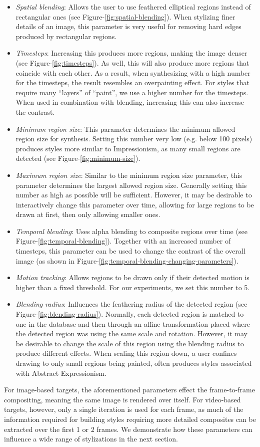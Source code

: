 \documentclass[a4paper,10pt,final]{ThesisStyle}
\begin{document}
\begin{itemize}
\item \textit{Spatial blending}: Allows the user to use feathered elliptical regions instead of rectangular ones (see Figure-\ref{fig:spatial-blending}).  When stylizing finer details of an image, this parameter is very useful for removing hard edges produced by rectangular regions.  
\item \textit{Timesteps}: Increasing this produces more regions, making the image denser (see Figure-\ref{fig:timesteps}).  As well, this will also produce more regions that coincide with each other.  As a result, when synthesizing with a high number for the timesteps, the result resembles an overpainting effect.  For styles that require many ``layers'' of ``paint'', we use a higher number for the timesteps.  When used in combination with blending, increasing this can also increase the contrast.
\item \textit{Minimum region size}: This parameter determines the minimum allowed region size for synthesis.  Setting this number very low (e.g. below 100 pixels) produces styles more similar to Impressionism, as many small regions are detected (see Figure-\ref{fig:minimum-size}).  
\item \textit{Maximum region size}: Similar to the minimum region size parameter, this parameter determines the largest allowed region size. Generally setting this number as high as possible will be sufficient.  However, it may be desirable to interactively change this parameter over time, allowing for large regions to be drawn at first, then only allowing smaller ones. 
\item \textit{Temporal blending}: Uses alpha blending to composite regions over time (see Figure-\ref{fig:temporal-blending}).  Together with an increased number of timesteps, this parameter can be used to change the contrast of the overall image (as shown in Figure-\ref{fig:temporal-blending-changing-parameters}).  
\item \textit{Motion tracking}: Allows regions to be drawn only if their detected motion is higher than a fixed threshold.  For our experiments, we set this number to 5.  
\item \textit{Blending radius}: Influences the feathering radius of the detected region (see Figure-\ref{fig:blending-radius}).  Normally, each detected region is matched to one in the database and then through an affine transformation placed where the detected region was using the same scale and rotation.  However, it may be desirable to change the scale of this region using the blending radius to produce different effects.  When scaling this region down, a user confines drawing to only small regions being painted, often produces styles associated with Abstract Expressionism.
\end{itemize}
For image-based targets, the aforementioned parameters effect the frame-to-frame compositing, meaning the same image is rendered over itself.  For video-based targets, however, only a single iteration is used for each frame, as much of the information required for building styles requiring more detailed composites can be extracted over the first 1 or 2 frames.  We demonstrate how these parameters can influence a wide range of stylizations in the next section.
\end{document}
